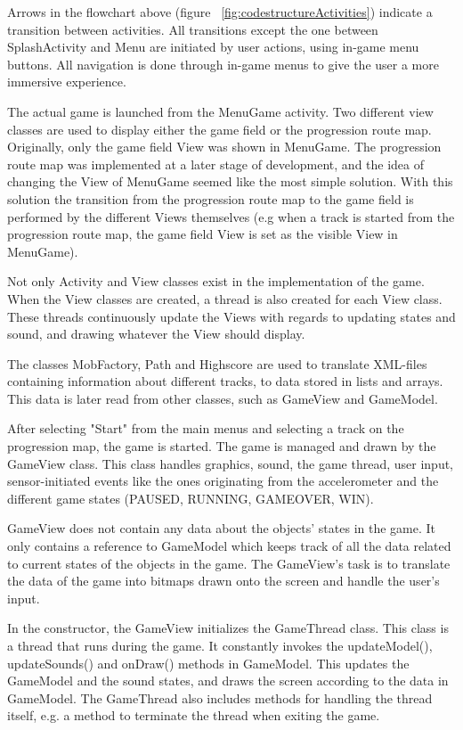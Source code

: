 Arrows in the flowchart above (figure ~\ref{fig:codestructureActivities}) indicate a transition between activities. All transitions except the one between SplashActivity and Menu are initiated by user actions, using in-game menu buttons. All navigation is done through in-game menus to give the user a more immersive experience.

The actual game is launched from the MenuGame activity. Two different view classes are used to display either the game field or the progression route map. Originally, only the game field View was shown in MenuGame. The progression route map was implemented at a later stage of development, and the idea of changing the View of MenuGame seemed like the most simple solution. With this solution the transition from the progression route map to the game field is performed by the different Views themselves (e.g when a track is started from the progression route map, the game field View is set as the visible View in MenuGame).

Not only Activity and View classes exist in the implementation of the game. When the View classes are created, a thread is also created for each View class. These threads continuously update the Views with regards to updating states and sound, and drawing whatever the View should display. 

The classes MobFactory, Path and Highscore are used to translate XML-files containing information about different tracks, to data stored in lists and arrays. This data is later read from other classes, such as GameView and GameModel.
 
After selecting "Start" from the main menus and selecting a track on the progression map, the game is started. The game is managed and drawn by the GameView class. This class handles graphics, sound, the game thread, user input, sensor-initiated events like the ones originating from the accelerometer and the different game states (PAUSED, RUNNING, GAMEOVER, WIN).

GameView does not contain any data about the objects' states in the game. It only contains a reference to GameModel which keeps track of all the data related to current states of the objects in the game. The GameView's task is to translate the data of the game into bitmaps drawn onto the screen and handle the user's input. 

In the constructor, the GameView initializes the GameThread class. This class is a thread that runs during the game. It constantly invokes the updateModel(), updateSounds() and onDraw() methods in GameModel. This updates the GameModel and the sound states, and draws the screen according to the data in GameModel. The GameThread also includes methods for handling the thread itself, e.g. a method to terminate the thread when exiting the game.

